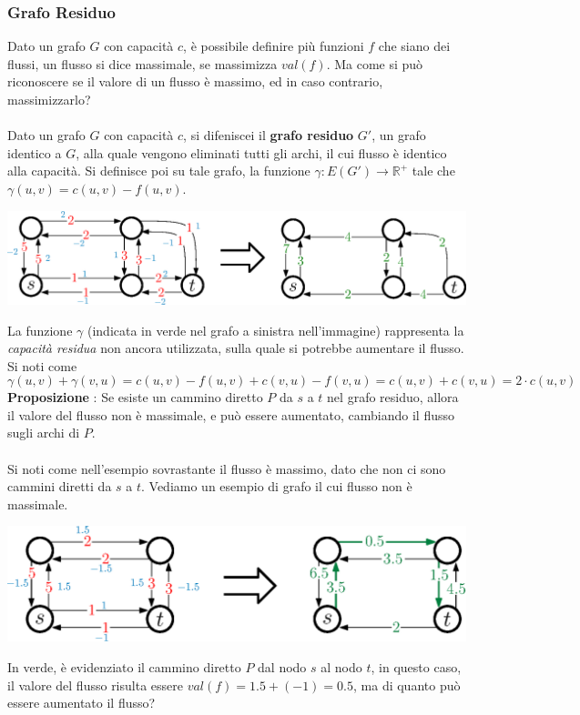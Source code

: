 \documentclass[12pt, letterpaper]{article}
\newcommand{\acc}{\\\hphantom{}\\}
\begin{document}
\subsubsection{Grafo Residuo}
Dato un grafo $G$ con capacità $c$, è possibile definire più funzioni $f$ che siano dei flussi, un flusso si dice 
massimale, se massimizza $val(f)$. Ma come si può riconoscere se il valore di un flusso è massimo, ed in caso contrario, massimizzarlo?\acc 
Dato un grafo $G$ con capacità $c$, si difeniscei il \textbf{grafo residuo} $G'$, un grafo identico a $G$, alla quale 
vengono eliminati tutti gli archi, il cui flusso è identico alla capacità. Si definisce poi su tale grafo, la funzione 
$\gamma : E(G')\rightarrow \mathbb{R}^+$ tale che $\gamma(u,v)=c(u,v)-f(u,v)$. \begin{center}
    \includegraphics[width=\textwidth ]{images/grafoResiduo.eps}
\end{center}
La funzione $\gamma$ (indicata in verde nel grafo a sinistra nell'immagine) rappresenta la 
\textit{capacità residua} non ancora utilizzata, sulla quale si potrebbe aumentare il flusso. Si noti come $$
\gamma(u,v)+\gamma(v,u)=c(u,v)-f(u,v)+c(v,u)-f(v,u)=c(u,v)+c(v,u)=2\cdot c(u,v)$$
\textbf{Proposizione} : Se esiste un cammino diretto $P$ da $s$ a $t$ nel grafo residuo, allora il valore del flusso 
non è massimale, e può essere aumentato, cambiando il flusso sugli archi di $P$.\acc 
Si noti come nell'esempio sovrastante il flusso è massimo, dato che non ci sono cammini diretti da $s$ a $t$. Vediamo un esempio 
di grafo il cui flusso non è massimale.\begin{center}
    \includegraphics[width=\textwidth ]{images/grafoResiduo2.eps}
\end{center}
In verde, è evidenziato il cammino diretto $P$ dal nodo $s$ al nodo $t$, in questo caso, il valore del 
flusso risulta essere $val(f)=1.5+(-1)=0.5$, ma di quanto può essere aumentato il flusso?\acc 
\end{document}
